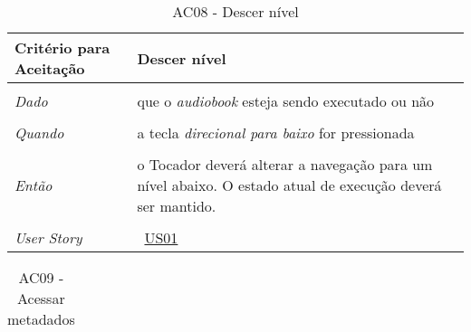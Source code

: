 \begin{apendicesenv}
\begin{table}[ht]
\begin{center}
\begin{tabularx}{\textwidth}{|lX|l|}
\end{tabularx}
\end{center}
\label{tab:us01a7}
\end{table}


\begin{table}[ht]
\centering
\caption{AC08 - Descer nível}
\vspace{0.1cm}
\begin{center}
\begin{tabularx}{\textwidth}{|lX|l|}

\hline
\textbf{Critério para Aceitação} & Descer nível \\
\hline
 & \\
\textit{Dado} & que o \textit{audiobook} esteja sendo executado ou não \\
 & \\
\textit{Quando} & a tecla \textit{direcional para baixo} for pressionada \\
 & \\
\textit{Então} & o Tocador deverá alterar a navegação para um nível abaixo. O estado atual de execução deverá ser mantido. \\
 & \\
\hline
\textit{User Story} & ~\hyperref[tab:us01]{US01} \\
\hline

\end{tabularx}
\end{center}
\label{tab:us01a8}
\end{table}


\begin{table}[ht]
\centering
\caption{AC09 - Acessar metadados}
\vspace{0.1cm}
\begin{center}
\begin{tabularx}{\textwidth}{|lX|l|}


\end{tabularx}
\end{center}
\end{table}
\end{apendicesenv}
